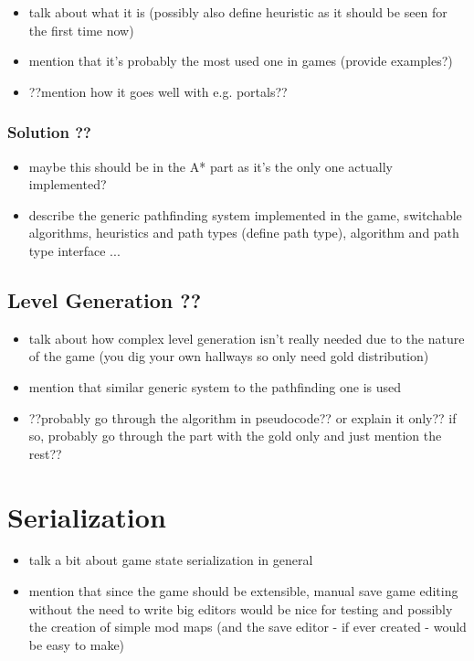 \begin{itemize}
	\item talk about what it is (possibly also define heuristic as it should
		be seen for the first time now)
	\item mention that it's probably the most used one in games (provide examples?)
	\item ??mention how it goes well with e.g. portals??
\end{itemize}

\subsubsection{Solution ??}

\begin{itemize}
    \item maybe this should be in the A* part as it's the only one actually implemented?
    \item describe the generic pathfinding system implemented in the game, switchable
	    algorithms, heuristics and path types (define path type),
	    algorithm and path type interface ...
\end{itemize}

\subsection{Level Generation ??}

\begin{itemize}
    \item talk about how complex level generation isn't really needed due
	    to the nature of the game (you dig your own hallways so only need
	    gold distribution)
    \item mention that similar generic system to the pathfinding one is used
    \item ??probably go through the algorithm in pseudocode?? or explain it only??
	    if so, probably go through the part with the gold only and just mention
	    the rest??
\end{itemize}

\section{Serialization}

\begin{itemize}
    \item talk a bit about game state serialization in general
    \item mention that since the game should be extensible, manual save game
	    editing without the need to write big editors would be nice
	    for testing and possibly the creation of simple mod maps
	    (and the save editor - if ever created - would be easy to make)
\end{itemize}


